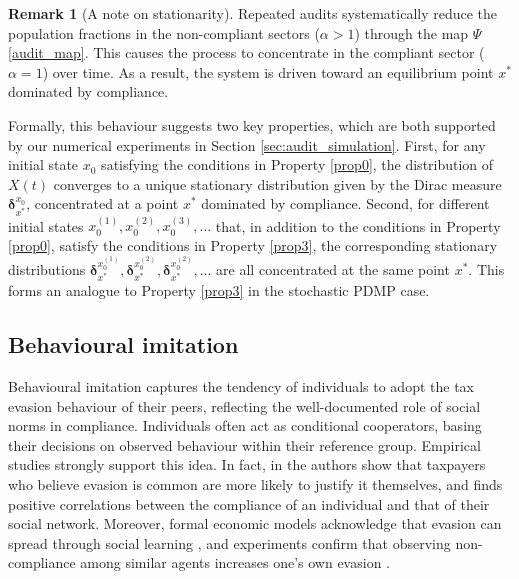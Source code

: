 \documentclass[11pt]{article}
\theoremstyle{plain}
\theoremstyle{definition}
\newtheorem{remark}{Remark}
\newcommand{\1}{\mathbf{1}}
\begin{document}
\begin{remark}[A note on stationarity]
\label{Rem_St_aud}
Repeated audits systematically reduce the population fractions in the non-compliant sectors ($\alpha>1$) through the map $\Psi$ \eqref{audit_map}. This causes the process to concentrate in the compliant sector ($\alpha=1$) over time. As a result, the system is driven toward an equilibrium point $x^*$ dominated by compliance. 

Formally, this behaviour suggests two key properties, which are both supported by our numerical experiments in Section \ref{sec:audit_simulation}. First, for any initial state $x_0$ satisfying the conditions in Property \ref{prop0}, the distribution of $X(t)$ converges to a unique stationary distribution given by the Dirac measure $\boldsymbol{\delta}_{x^*}^{x_0}$, concentrated at a point $x^*$ dominated by compliance. Second, for different initial states $x_0^{(1)}, x_0^{(2)}, x_0^{(3)}, \ldots$ that, in addition to the conditions in Property \ref{prop0}, satisfy the conditions in Property \ref{prop3}, the corresponding stationary distributions $\boldsymbol{\delta}_{x^*}^{x_0^{(1)}}, \boldsymbol{\delta}_{x^*}^{x_0^{(2)}}, \boldsymbol{\delta}_{x^*}^{x_0^{(2)}}, \ldots$ are all concentrated at the same point $x^*$. This forms an analogue to Property \ref{prop3} in the stochastic PDMP case. %
\end{remark}


\subsection{Behavioural imitation}
\label{Sec_behave}

Behavioural imitation captures the tendency of individuals to adopt the tax evasion behaviour of their peers, reflecting the well-documented role of social norms in compliance. Individuals often act as conditional cooperators, basing their decisions on observed behaviour within their reference group. Empirical studies strongly support this idea. In fact, in \cite{alm2011ethics} the authors show that taxpayers who believe evasion is common are more likely to justify it themselves, and \cite{luttmer2014tax} finds positive correlations between the compliance of an individual and that of their social network. Moreover, formal economic models acknowledge that evasion can spread through social learning \cite{myles1996model}, and experiments confirm that observing non-compliance among similar agents increases one's own evasion \cite{fortin2007tax}.
\end{document}
